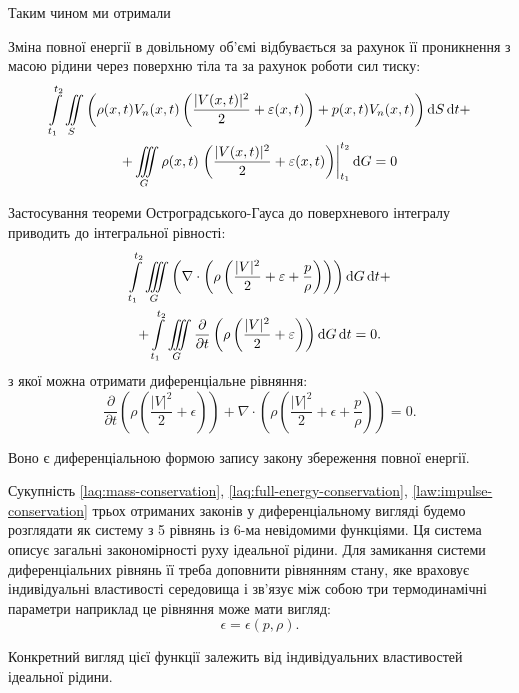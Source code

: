 Таким чином ми отримали
\begin{law*}
	\label{laq:full-energy-conservation}
	Зміна повної енергії в довільному об'ємі відбувається за рахунок її проникнення з масою рідини через поверхню тіла та за рахунок роботи сил тиску:
	\begin{multline}
		\displaystyle\int\limits_{t_1}^{t_2} \displaystyle\iint\limits_S \left( \rho(x, t) V_n(x, t) \left( \frac{|V(x, t)|^2}{2} + \varepsilon(x, t) \right) + p(x, t) V_n(x, t) \right) \mathop{}\!\mathrm{d} S \mathop{}\!\mathrm{d} t + \\
		+ \displaystyle\iiint\limits_G \rho(x, t) \left. \left( \frac{|V(x, t)|^2}{2} + \varepsilon(x, t) \right) \right|_{t_1}^{t_2} \mathop{}\!\mathrm{d} G = 0
	\end{multline}
\end{law*}

Застосування теореми Остроградського-Гауса до поверхневого інтегралу приводить до інтегральної рівності:
\begin{multline}
	\displaystyle\int\limits_{t_1}^{t_2} \displaystyle\iiint\limits_G \left(\nabla \cdot \left( \rho \left( \frac{|V|^2}{2} + \varepsilon + \frac{p}{\rho} \right) \right)\right) \mathop{}\!\mathrm{d} G \mathop{}\!\mathrm{d} t + \\
	+ \displaystyle\int\limits_{t_1}^{t_2} \displaystyle\iiint\limits_G \frac{\partial}{\partial t} \left( \rho \left( \frac{|V|^2}{2} + \varepsilon \right) \right) \mathop{}\!\mathrm{d} G \mathop{}\!\mathrm{d} t = 0.
\end{multline}
з якої можна отримати диференціальне рівняння:
\begin{equation}
	\frac{\partial}{\partial t} \left( \rho \left( \frac{|V|^2}{2} + \epsilon \right) \right) +\nabla \cdot \left( \rho \left( \frac{|V|^2}{2} + \epsilon + \frac{p}{\rho} \right) \right) = 0.
\end{equation}

Воно є диференціальною формою запису закону збереження повної енергії. \medskip

Сукупність \ref{laq:mass-conservation}, \ref{laq:full-energy-conservation}, \ref{law:impulse-conservation} трьох отриманих законів у диференціальному вигляді будемо розглядати як систему з 5 рівнянь із 6-ма невідомими функціями. Ця система описує загальні закономірності руху ідеальної рідини. Для замикання системи диференціальних рівнянь її треба доповнити рівнянням стану, яке враховує індивідуальні властивості середовища і зв'язує між собою три термодинамічні параметри наприклад це рівняння може мати вигляд:
\begin{equation}
	\epsilon = \epsilon(p, \rho).
\end{equation}

Конкретний вигляд цієї функції залежить від індивідуальних властивостей ідеальної рідини. 

